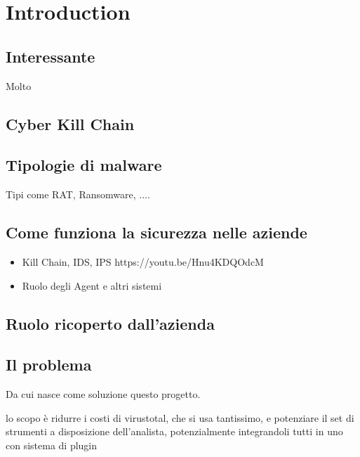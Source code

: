 \chapter{Introduction}

\section{Interessante}
Molto \cite{aws_inforce_malware}

\section{Cyber Kill Chain}

\section{Tipologie di malware}
Tipi come RAT, Ransomware, ....

\section{Come funziona la sicurezza nelle aziende}
\begin{itemize}
    \item Kill Chain, IDS, IPS https://youtu.be/Hnu4KDQOdcM
    \item Ruolo degli Agent e altri sistemi
\end{itemize}

\section{Ruolo ricoperto dall'azienda}

\section{Il problema}
Da cui nasce come soluzione questo progetto.

lo scopo è ridurre i costi di virustotal, che si usa tantissimo, e potenziare il set di strumenti a disposizione dell'analista, potenzialmente integrandoli tutti in uno con sistema di plugin